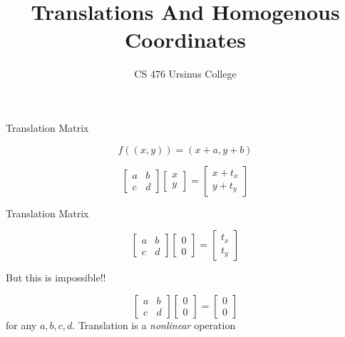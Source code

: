 \documentclass{beamer}
\title{Translations And Homogenous Coordinates}
\institute{Chris Tralie, Ursinus College}
\author{CS 476 Ursinus College}
\date{}
\begin{document}
\frame{\titlepage}


\begin{frame}{Translation Matrix}

\[ f((x, y)) = (x + a, y + b) \]

\[  \left[  \begin{array}{cc} a & b \\ c & d  \end{array} \right] \left[ \begin{array}{c} x \\ y \end{array} \right] =  \left[ \begin{array}{c} x + t_x \\ y + t_y \end{array} \right] \]



\end{frame}


\begin{frame}{Translation Matrix}

	
	\[  \left[  \begin{array}{cc} a & b \\ c & d  \end{array} \right] \left[ \begin{array}{c} 0 \\ 0 \end{array} \right] =  \left[ \begin{array}{c} t_x \\ t_y \end{array} \right] \]

	 {
		But this is impossible!!
	}

	\[  \left[  \begin{array}{cc} a & b \\ c & d  \end{array} \right] \left[ \begin{array}{c} 0 \\ 0 \end{array} \right] =  \left[ \begin{array}{c} 0 \\ 0 \end{array} \right] \]
	for any $a, b, c, d$.  Translation is a {\em nonlinear} operation

\end{frame}
\end{document}
